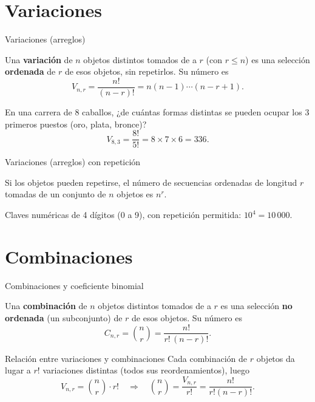 \documentclass[aspectratio=169,11pt]{beamer}
\begin{document}
\section{Variaciones}

\begin{frame}{Variaciones (arreglos)}
\begin{definition}
Una \textbf{variación} de $n$ objetos distintos tomados de a $r$ (con $r\leq n$) es una selección \textbf{ordenada} de $r$ de esos objetos, sin repetirlos. Su número es
\[
V_{n,r} = \frac{n!}{(n-r)!} = n(n-1)\cdots(n-r+1).
\]
\end{definition}
\begin{example}
En una carrera de 8 caballos, ¿de cuántas formas distintas se pueden ocupar los 3 primeros puestos (oro, plata, bronce)?
\[
V_{8,3} = \frac{8!}{5!} = 8\times7\times6 = 336.
\]
\end{example}
\end{frame}

\begin{frame}{Variaciones (arreglos) con repetición}
\begin{definition}
Si los objetos pueden repetirse, el número de secuencias ordenadas de longitud $r$ tomadas de un conjunto de $n$ objetos es $n^r$.
\end{definition}
\begin{example}
Claves numéricas de 4 dígitos (0 a 9), con repetición permitida: $10^4 = 10\,000$.
\end{example}
\end{frame}

\section{Combinaciones}

\begin{frame}{Combinaciones y coeficiente binomial}
\begin{definition}
Una \textbf{combinación} de $n$ objetos distintos tomados de a $r$ es una selección \textbf{no ordenada} (un subconjunto) de $r$ de esos objetos. Su número es
\[
C_{n,r} = \binom{n}{r} = \frac{n!}{r!\,(n-r)!}.
\]
\end{definition}
\begin{block}{Relación entre variaciones y combinaciones}
Cada combinación de $r$ objetos da lugar a $r!$ variaciones distintas (todos sus reordenamientos), luego
\[
V_{n,r} = \binom{n}{r} \cdot r! \quad\Longrightarrow\quad \binom{n}{r} = \frac{V_{n,r}}{r!} = \frac{n!}{r!(n-r)!}.
\]
\end{block}
\end{frame}
\end{document}
